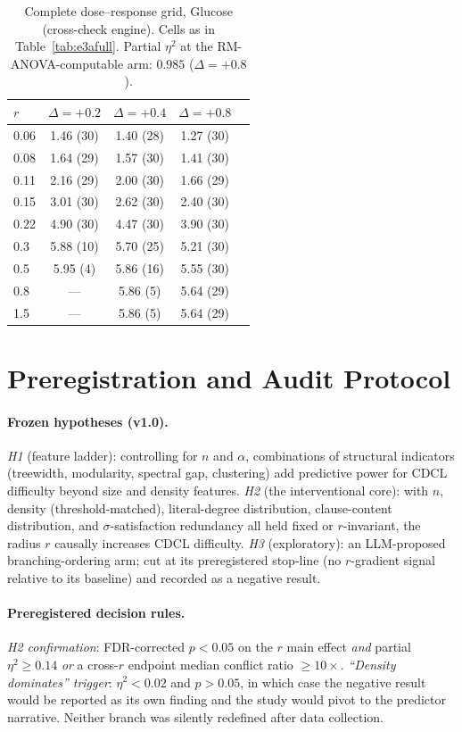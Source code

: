 \documentclass[manuscript, screen, review]{jair}
\begin{document}
\begin{table}[h]
\centering
\caption{Complete dose--response grid, Glucose (cross-check engine). Cells as
in Table~\ref{tab:e3afull}. Partial $\eta^2$ at the RM-ANOVA-computable arm:
$0.985$ ($\Delta{=}{+}0.8$).}
\label{tab:e3afullg}
\begin{tabular}{lcccc}
\toprule
$r$ & $\Delta{=}{+}0.2$ & $\Delta{=}{+}0.4$ & $\Delta{=}{+}0.8$\\
\midrule
0.06 & 1.46 (30) & 1.40 (28) & 1.27 (30)\\
0.08 & 1.64 (29) & 1.57 (30) & 1.41 (30)\\
0.11 & 2.16 (29) & 2.00 (30) & 1.66 (29)\\
0.15 & 3.01 (30) & 2.62 (30) & 2.40 (30)\\
0.22 & 4.90 (30) & 4.47 (30) & 3.90 (30)\\
0.3 & 5.88 (10) & 5.70 (25) & 5.21 (30)\\
0.5 & 5.95 (4) & 5.86 (16) & 5.55 (30)\\
0.8 & --- & 5.86 (5) & 5.64 (29)\\
1.5 & --- & 5.86 (5) & 5.64 (29)\\
\bottomrule
\end{tabular}
\end{table}

\section{Preregistration and Audit Protocol}
\label{app:protocol}

\paragraph{Frozen hypotheses (v1.0).}
\emph{H1} (feature ladder): controlling for $n$ and $\alpha$, combinations of
structural indicators (treewidth, modularity, spectral gap, clustering) add
predictive power for CDCL difficulty beyond size and density features.
\emph{H2} (the interventional core): with $n$, density (threshold-matched),
literal-degree distribution, clause-content distribution, and
$\sigma$-satisfaction redundancy all held fixed or $r$-invariant, the radius
$r$ causally increases CDCL difficulty. \emph{H3} (exploratory): an
LLM-proposed branching-ordering arm; cut at its preregistered stop-line
(no $r$-gradient signal relative to its baseline) and recorded as a negative
result.

\paragraph{Preregistered decision rules.}
\emph{H2 confirmation}: FDR-corrected $p<0.05$ on the $r$ main effect
\emph{and} partial $\eta^2 \ge 0.14$ \emph{or} a cross-$r$ endpoint median
conflict ratio $\ge 10\times$. \emph{``Density dominates'' trigger}:
$\eta^2 < 0.02$ and $p>0.05$, in which case the negative result would be
reported as its own finding and the study would pivot to the predictor
narrative. Neither branch was silently redefined after data collection.
\end{document}
